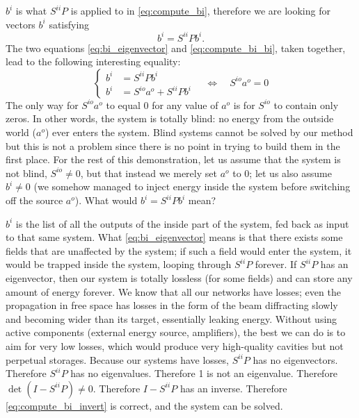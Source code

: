 $b^i$ is what $S^{ii}P$ is applied to in \cref{eq:compute_bi}, therefore we are looking for vectors $b^i$ satisfying
\begin{equation}
    b^i = S^{ii}P b^i \text{.} \label{eq:bi_eigenvector}
\end{equation}
The two equations \cref{eq:bi_eigenvector} and  \cref{eq:compute_bi_bi}, taken together, 
lead to the following interesting equality:
\begin{equation}
    \left\lbrace
        \begin{aligned}
            b^i &= S^{ii}P b^i \\
            b^i &= S^{io}a^o + S^{ii}P b^i
        \end{aligned}
    \right.
    \quad
    \Longleftrightarrow
    \quad
    S^{io}a^o = 0
\end{equation}
The only way for $S^{io}a^o$ to equal 0 for any value of $a^o$ is for $S^{io}$ to contain only zeros.
In other words, the system is totally blind: no energy from the outside world ($a^o$) ever enters the system.
Blind systems cannot be solved by our method but this is not a problem since there is no point in trying to build them in the first place.
For the rest of this demonstration, let us assume that the system is not blind, $S^{io}\neq 0$, but that instead we merely set $a^o$ to 0; let us also assume $b^i \neq 0$ (we somehow managed to inject energy inside the system before switching off the source $a^o$).
What would $b^i = S^{ii}P b^i$ mean?

$b^i$ is the list of all the outputs of the inside part of the system, fed back as input to that same system.
What \cref{eq:bi_eigenvector} means is that there exists some fields that are unaffected by the system; if such a field would enter the system, it would be trapped inside the system, looping through $S^{ii}P$ forever.
If $S^{ii}P$ has an eigenvector, then our system is totally lossless (for some fields) and can store any amount of energy forever.
We know that all our networks have losses; even the propagation in free space has losses in the form of the beam diffracting slowly and becoming wider than its target, essentially leaking energy.
Without using active components (external energy source, amplifiers), the best we can do is to aim for very low losses, which would produce very high-quality cavities but not perpetual storages.
Because our systems have losses, $S^{ii}P$ has no eigenvectors.
Therefore $S^{ii}P$ has no eigenvalues.
Therefore 1 is not an eigenvalue.
Therefore $\det(I-S^{ii}P) \neq 0$.
Therefore $I-S^{ii}P$ has an inverse.
Therefore \cref{eq:compute_bi_invert} is correct, and the system can be solved.

